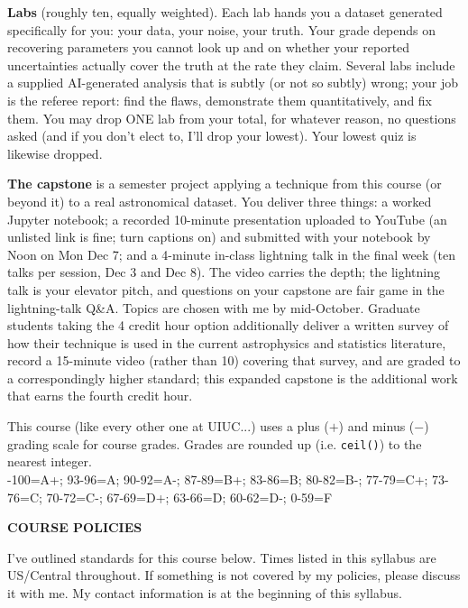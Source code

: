 {\bf Labs} (roughly ten, equally weighted). Each lab hands you a dataset generated specifically for you: your data, your
noise, your truth. Your grade depends on recovering parameters you cannot
look up and on whether your reported uncertainties actually cover the truth at
the rate they claim. Several labs include a supplied AI-generated analysis
that is subtly (or not so subtly) wrong; your job is the referee report:
find the flaws, demonstrate them quantitatively, and fix them. You may drop
ONE lab from your total, for whatever reason, no questions asked (and if you
don't elect to, I'll drop your lowest). Your lowest quiz is likewise dropped.

{\bf The capstone} is a semester project applying a technique from this course
(or beyond it) to a real astronomical dataset. You deliver three things: a
worked Jupyter notebook; a recorded 10-minute presentation uploaded to YouTube
(an unlisted link is fine; turn captions on) and submitted with your notebook
by Noon on Mon Dec 7; and a 4-minute in-class lightning talk in the final week
(ten talks per session, Dec 3 and Dec 8). The video carries the depth; the
lightning talk is your elevator pitch, and questions on your capstone are fair
game in the lightning-talk Q\&A. Topics are chosen with me by mid-October. Graduate students taking the 4 credit hour
option additionally deliver a written survey of how their technique is used in
the current astrophysics and statistics literature, record a 15-minute video
(rather than 10) covering that survey, and are graded to a correspondingly
higher standard; this expanded capstone is the additional work that earns the
fourth credit hour.

This course (like every other one at UIUC...) uses a plus ($+$) and minus
($-$) grading scale for course grades.
Grades are rounded up (i.e. \texttt{ceil()}) to the nearest integer.\\
-100=A+; 93-96=A; 90-92=A-; 87-89=B+; 83-86=B; 80-82=B-; 77-79=C+; 73-76=C; 70-72=C-;
67-69=D+; 63-66=D; 60-62=D-; 0-59=F
\medskip

{\large \bf \headerfont \color{RoyalBlue} COURSE POLICIES}

I've outlined standards for this course below. Times listed in this
syllabus are US/Central throughout. If something is not covered by my policies,
please discuss it with me. My contact information is at the beginning of this
syllabus.\\
\medskip

